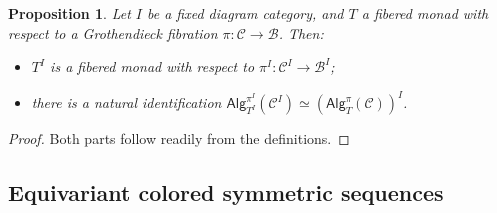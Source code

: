 \documentclass[a4paper,10pt
,draft
]{article}%
\numberwithin{equation}{section}
\numberwithin{figure}{section}
\newtheorem{proposition}[equation]{Proposition}%
\theoremstyle{definition} %
\newcommand{\1}{\ensuremath{\mathbbm 1}}%
\begin{document}
\begin{proposition}\label{DIAGRAMFM_PROP}
Let $I$ be a fixed diagram category, and $T$ a fibered monad with respect to a Grothendieck fibration 
$\pi \colon \mathcal{C} \to \mathcal{B}$. Then:
\begin{itemize}
\item[(i)] $T^I$ is a fibered monad with respect to $\pi^I\colon \mathcal{C}^I \to \mathcal{B}^I$;
\item[(ii)] there is a natural identification 
$\mathsf{Alg}_{T^I}^{\pi^I}(\mathcal{C}^I)
\simeq
\left(\mathsf{Alg}_T^{\pi}(\mathcal{C})\right)^I$.
\end{itemize}
\end{proposition}

\begin{proof}
Both parts follow readily from the definitions.
\end{proof}






\subsection{Equivariant colored symmetric sequences}
\end{document}
